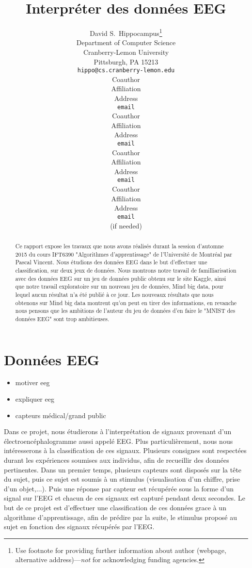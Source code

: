 \documentclass{article} %
\title{Interpréter des données EEG}
\author{
David S.~Hippocampus\thanks{ Use footnote for providing further information
about author (webpage, alternative address)---\emph{not} for acknowledging
funding agencies.} \\
Department of Computer Science\\
Cranberry-Lemon University\\
Pittsburgh, PA 15213 \\
\texttt{hippo@cs.cranberry-lemon.edu} \\
\And
Coauthor \\
Affiliation \\
Address \\
\texttt{email} \\
\AND
Coauthor \\
Affiliation \\
Address \\
\texttt{email} \\
\And
Coauthor \\
Affiliation \\
Address \\
\texttt{email} \\
\And
Coauthor \\
Affiliation \\
Address \\
\texttt{email} \\
(if needed)\\
}
\begin{document}
\maketitle

\begin{abstract}
Ce rapport expose les travaux que nous avons réalisés durant la session d'automne 2015 du cours IFT6390 "Algorithmes d'apprentissage" de l'Université de Montréal par Pascal Vincent. Nous étudions des données EEG dans le but d'effectuer une classification, sur deux jeux de données. Nous montrons notre travail de familliarisation avec des données EEG sur un jeu de données public obtenu sur le site Kaggle, ainsi que notre travail exploratoire sur un nouveau jeu de données, Mind big data, pour lequel aucun résultat n'a été publié à ce jour. Les nouveaux résultats que nous obtenons sur Mind big data montrent qu'on peut en tirer des informations, en revanche nous pensons que les ambitions de l'auteur du jeu de données d'en faire le "MNIST des données EEG" sont trop ambitieuses.
\end{abstract}

\section{Données EEG}

\begin{itemize}
\item motiver eeg
\item expliquer eeg
\item capteurs médical/grand public
\end{itemize}

Dans ce projet, nous étudierons à l’interprétation de signaux provenant d’un électroencéphalogramme aussi appelé EEG. Plus particulièrement, nous nous intéresserons à la classification de ces signaux.
Plusieurs consignes sont respectées durant les expériences soumises aux individus, afin de recueillir des données pertinentes. Dans un premier temps, plusieurs capteurs sont disposés sur la tête du sujet, puis ce sujet est soumis à un stimulus (visualisation d’un chiffre, prise d’un objet,...). Puis une réponse par capteur est récupérée sous la forme d’un signal sur l’EEG et chacun de ces signaux est capturé pendant deux secondes.
Le but de ce projet est d’effectuer une classification de ces données grace à un algorithme d’apprentissage, afin de prédire par la suite, le stimulus proposé au sujet en fonction des signaux récupérés par l’EEG.
\end{document}
